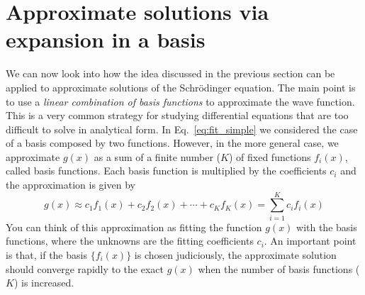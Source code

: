 \documentclass[../Main/chem371-notes.tex]{subfiles}
\begin{document}
\section{Approximate solutions via expansion in a basis}
We can now look into how the idea discussed in the previous section can be applied to approximate solutions of the Schr\"{o}dinger equation.
The main point is to use a \emph{linear combination of basis functions} to approximate the wave function.
This is a very common strategy for studying differential equations that are too difficult to solve in analytical form.
In Eq.~\eqref{eq:fit_simple} we considered the case of a basis composed by two functions.
However, in the more general case, we approximate $g(x)$ as a sum of a finite number ($K$) of fixed functions $f_i(x)$, called basis functions.
Each basis function is multiplied by the coefficients $c_i$ and the approximation is given by
\begin{equation}
g(x) \approx  c_1 f_1(x) +  c_2 f_2(x) + \cdots + c_K f_K(x) = \sum_{i=1}^{K} c_i f_i(x) 
\end{equation}
You can think of this approximation as fitting the function $g(x)$ with the basis functions, where the unknowns are the fitting coefficients $c_i$.
An important point is that, if the basis $\{ f_i(x) \}$ is chosen judiciously, the approximate solution should converge rapidly to the exact $g(x)$ when the number of basis functions ($K$) is increased.
\end{document}
